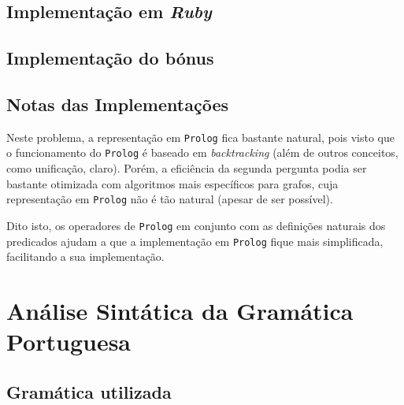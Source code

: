 \documentclass[12pt,a4paper,oneside]{article}
\begin{document}
\subsection{Implementação em \textit{Ruby}}

\lipsum[1]

\lipsum[2]

\lipsum[3]

\subsection{Implementação do bónus}

\lipsum[1]

\lipsum[2]

\lipsum[3]

\subsection{Notas das Implementações}

Neste problema, a representação em \texttt{Prolog} fica bastante
natural, pois visto que o funcionamento do \texttt{Prolog} é baseado
em \textit{backtracking} (além de outros conceitos, como unificação,
claro). Porém, a eficiência da segunda pergunta podia ser bastante
otimizada com algoritmos mais específicos para grafos, cuja
representação em \texttt{Prolog} não é tão natural (apesar de ser
possível).

Dito isto, os operadores de \texttt{Prolog} em conjunto com as
definições naturais dos predicados ajudam a que a implementação em
\texttt{Prolog} fique mais simplificada, facilitando a sua
implementação.


\section{Análise Sintática da Gramática Portuguesa}
\label{sec:sin}

\lipsum[1]

\subsection{Gramática utilizada}

\lipsum[1]

\lipsum[2]
\end{document}
